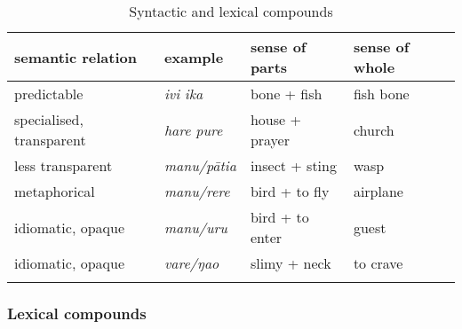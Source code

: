 \begin{table}
\begin{tabularx}{\textwidth}{L{39mm}L{21mm}L{26mm}L{27mm}}
\lsptoprule
{semantic relation} & {example} & {sense of parts} & {sense of whole}\\
\midrule
predictable & \textit{ivi ika} & bone + fish & fish bone\\
specialised, transparent & \textit{hare pure}  & house + prayer & church \\
less transparent & \textit{manu/pātia}\footnotemark{} & insect + sting & wasp\\
metaphorical & \textit{manu/rere} & bird + to fly & airplane\\
idiomatic, opaque & \textit{manu/uru} & bird + to enter & guest \\
idiomatic, opaque & \textit{vare/ŋao}& slimy + neck & to crave \\
\lspbottomrule
\end{tabularx}
\caption{Syntactic and lexical compounds}
\label{tab:39}
\end{table}

\subsubsection[Lexical compounds]{Lexical compounds}\label{sec:5.7.2.1}

